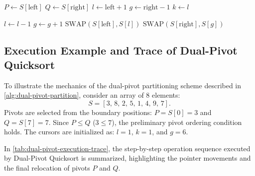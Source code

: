 \begin{algorithm}[H]
\caption{Dual-Pivot Partitioning (Yaroslavskiy)}
\label{alg:dual-pivot-partition}

$P \leftarrow S[\text{left}]$\;
$Q \leftarrow S[\text{right}]$\;
$l \leftarrow \text{left} + 1$\;
$g \leftarrow \text{right} - 1$\;
$k \leftarrow l$\;

$l \leftarrow l - 1$\;
$g \leftarrow g + 1$\;
$\text{SWAP}(S[\text{left}], S[l])$\;
$\text{SWAP}(S[\text{right}], S[g])$\;
\;
\end{algorithm}

\subsection{Execution Example and Trace of Dual-Pivot Quicksort}
\label{subsec:dual-pivot-trace-example}

To illustrate the mechanics of the dual-pivot partitioning scheme described in \autoref{alg:dual-pivot-partition}, consider an array of 8 elements:
\begin{equation}
  S = [3, \, 8, \, 2, \, 5, \, 1, \, 4, \, 9, \, 7].
\end{equation}
Pivots are selected from the boundary positions: $P = S[0] = 3$ and $Q = S[7] = 7$. Since $P \le Q$ ($3 \le 7$), the preliminary pivot ordering condition holds. The cursors are initialized as: $l = 1$, $k = 1$, and $g = 6$.

In \autoref{tab:dual-pivot-execution-trace}, the step-by-step operation sequence executed by Dual-Pivot Quicksort is summarized, highlighting the pointer movements and the final relocation of pivots $P$ and $Q$.

